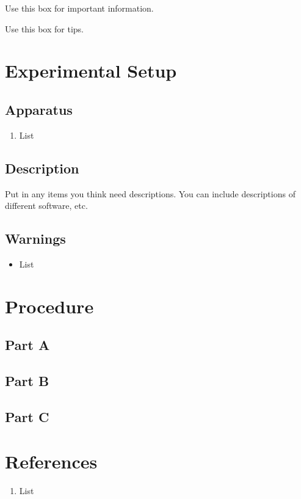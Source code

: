 \begin{imp}
Use this box for important information.
\end{imp}

\begin{tip}
Use this box for tips.
\end{tip}


 
\section*{Experimental Setup}


\subsection*{Apparatus}

\begin{enumerate}
\itemsep0em
\item List
\end{enumerate}



\subsection*{Description}

Put in any items you think need descriptions. You can include descriptions of different software, etc.

\subsection*{Warnings}
\begin{itemize}
\itemsep0em
\item List
\end{itemize}


\section*{Procedure}
\subsection*{Part A}

\subsection*{Part B}

\subsection*{Part C}



\section*{References}
\begin{enumerate}
\itemsep0em
\item List
\end{enumerate}

